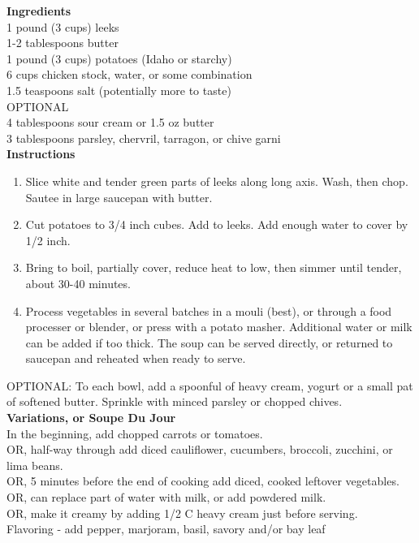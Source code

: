 \documentclass{article}
\numberwithin{figure}{section}
\numberwithin{equation}{section}
\begin{document}
{\bf Ingredients}\\
1 pound (3 cups) leeks\\
1-2 tablespoons butter\\
1 pound (3 cups) potatoes (Idaho or starchy)\\
6 cups chicken stock, water, or some combination\\
1.5 teaspoons salt (potentially more to taste)\\

OPTIONAL\\
4 tablespoons sour cream or 1.5 oz butter\\
3 tablespoons parsley, chervril, tarragon, or chive garni\\

{\bf Instructions}\\
\begin{enumerate}
\item Slice white and tender green parts of leeks along long axis. Wash, then chop. Sautee in large saucepan with butter.
\item Cut potatoes to 3/4 inch cubes. Add to leeks. Add enough water to cover by 1/2 inch.
\item Bring to boil, partially cover, reduce heat to low, then simmer until tender, about 30-40 minutes.
\item Process vegetables in several batches in a mouli (best), or through a food processer or blender, or press with a potato masher. Additional water or milk can be added if too thick. The soup can be served directly, or returned to saucepan and reheated when ready to serve.
\end{enumerate}


OPTIONAL:  To each bowl, add a spoonful of heavy cream, yogurt or a small pat of softened butter.  Sprinkle with minced parsley or chopped chives.\\

{\bf Variations, or Soupe Du Jour}\\
In the beginning, add chopped carrots or tomatoes. \\
OR, half-way through add diced cauliflower, cucumbers, broccoli, zucchini, or lima beans. \\
OR, 5 minutes before the end of cooking add diced, cooked leftover vegetables.\\
OR, can replace part of water with milk, or add powdered milk.\\
OR, make it creamy by adding 1/2 C heavy cream just before serving.\\
Flavoring - add pepper, marjoram, basil, savory and/or bay leaf\\
\end{document}
